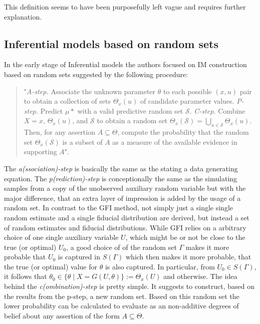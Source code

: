 \documentclass[
]{report}
\theoremstyle{definition}
\begin{document}
This definition seems to have been purposefully left vague and requires
further explanation.

\subsection{Inferential models based on random sets}

In the early stage of Inferential models the authors focused on IM
construction based on random sets suggested by the following procedure:

\begin{quote}
"\textit{A-step. } Associate the unknown parameter $\theta$ to each possible $(x, u)$ pair to obtain a collection of sets $\Theta_x(u)$ of candidate parameter values. \newline
\textit{P-step. } Predict $\mu*$ with a valid predictive random set $\mathcal{S}$. \newline
\textit{C-step. } Combine $X = x, \, \Theta_x (u)$, and $\mathcal{S}$ to obtain a random set $\Theta_x (\mathcal{S}) = \bigcup_{u \in {\mathcal{S}}} \Theta_x(u)$. Then, for any assertion $A \subseteq \Theta$, compute the probability that the random set $\Theta_x (\mathcal{S})$ is a subset of $A$ as a measure of the available evidence in supporting $A$"\cite{martin_inferential_2013}.
\end{quote}

The \textit{a(ssociation)-step} is basically the same as the stating a
data generating equation. The \textit{p(rediction)-step} is
conceptionally the same as the simulating samples from a copy of the
unobserved auxiliary random variable but with the major difference, that
an extra layer of impression is added by the usage of a random set. In
contrast to the GFI method, not simply just a single single random
estimate and a single fiducial distribution are derived, but instead a
set of random estimates and fiducial distributions. While GFI relies on
a arbitrary choice of one single auxiliary variable \(U\), which might
be or not be close to the true (or optimal) \(U_0\), a good choice of of
the random set \(\Gamma\) makes it more probable that \(U_0\) is
captured in \(S(\Gamma)\) which then makes it more probable, that the
true (or optimal) value for \(\theta\) is also captured. In particular,
from \(U_0 \in S(\Gamma)\), it follows that
\(\theta_0 \in \{ \theta \mid X = G(U, \theta) \} := \Theta_x(U)\) and
otherwise. The idea behind the \textit{c(ombination)-step} is pretty
simple. It suggests to construct, based on the results from the p-step,
a new random set. Based on this random set the lower probability can be
calculated to evaluate as an non-additive degrees of belief about any
assertion of the form \(A \subseteq \Theta\).


\printbibliography
\end{document}
